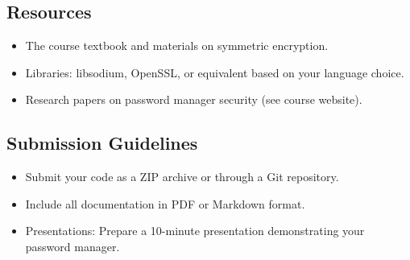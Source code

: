 \documentclass[10pt,a4paper,american]{exam}
\begin{document}
\subsection*{Resources}
\begin{itemize}
	\item The course textbook and materials on symmetric encryption.
	\item Libraries: libsodium, OpenSSL, or equivalent based on your language choice.
	\item Research papers on password manager security (see course website).
\end{itemize}

\subsection*{Submission Guidelines}
\begin{itemize}
	\item Submit your code as a ZIP archive or through a Git repository.
	\item Include all documentation in PDF or Markdown format.
	\item Presentations: Prepare a 10-minute presentation demonstrating your password manager.
\end{itemize}
\end{document}

